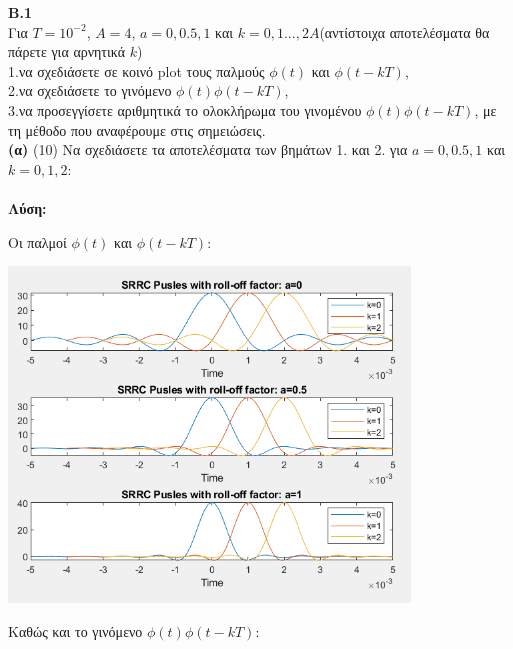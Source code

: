 \newpage

\begin{justify}
    {\bf  Β.1}\\
    Για $T=10^{-2}$, $A=4$, $a=0,0.5,1$ και $k=0,1...,2A$(αντίστοιχα
    αποτελέσματα θα πάρετε για αρνητικά $k$)\\
    1.να σχεδιάσετε σε κοινό \textlatin{plot} τους παλμούς $\phi(t)$ 
    και $\phi(t-kT)$,\\
    2.να σχεδιάσετε το γινόμενο $\phi(t)\phi(t-kT)$,\\
    3.να προσεγγίσετε αριθμητικά το ολοκλήρωμα του
    γινομένου $\phi(t)\phi(t-kT)$, με τη μέθοδο που αναφέρουμε
    στις σημειώσεις.\\

    {\bf (α)} (10) Να σχεδιάσετε τα αποτελέσματα των βημάτων
    1. και 2. για $a=0,0.5,1$ και $k=0,1,2$:\\\\
    \textbf{Λύση:}\\
\end{justify}

\begin{justify}
    Οι παλμοί $\phi(t)$ και $\phi(t-kT)$:
\end{justify}

\begin{center}
    \centering
    \includegraphics[width=0.8\textwidth]{BETA/Images/B1.1.png} %
\end{center}

\newpage

\begin{justify}
Καθώς και το γινόμενο $\phi(t)\phi(t-kT)$:     
\end{justify}


